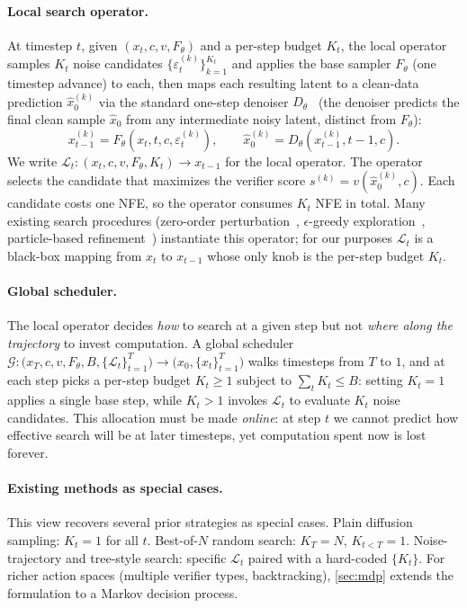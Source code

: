 \paragraph{Local search operator.}
At timestep $t$, given $(x_t, c, v, F_\theta)$ and a per-step budget $K_t$, the local operator samples $K_t$ noise candidates $\{\varepsilon_t^{(k)}\}_{k=1}^{K_t}$ and applies the base sampler $F_\theta$ (one timestep advance) to each, then maps each resulting latent to a clean-data prediction $\hat x_0^{(k)}$ via the standard one-step denoiser $D_\theta$~\citep{song2021scorebased} (the denoiser predicts the final clean sample $\hat x_0$ from any intermediate noisy latent, distinct from $F_\theta$):
\begin{equation}
  x_{t-1}^{(k)} = F_\theta(x_t, t, c, \varepsilon_t^{(k)}),
  \qquad
  \hat{x}_0^{(k)} = D_\theta(x_{t-1}^{(k)}, t-1, c).
  \label{eq:x0_prediction}
\end{equation}
We write $\mathcal{L}_t : (x_t, c, v, F_\theta, K_t) \to x_{t-1}$ for the local operator. The operator selects the candidate that maximizes the verifier score $s^{(k)} = v(\hat{x}_0^{(k)}, c)$. Each candidate costs one NFE, so the operator consumes $K_t$ NFE in total. Many existing search procedures (zero-order perturbation~\citep{tang2024dno}, $\epsilon$-greedy exploration~\citep{ramesh2025nts}, particle-based refinement~\citep{kim2025rbf}) instantiate this operator; for our purposes $\mathcal{L}_t$ is a black-box mapping from $x_t$ to $x_{t-1}$ whose only knob is the per-step budget $K_t$.

\paragraph{Global scheduler.}
The local operator decides \emph{how} to search at a given step but not \emph{where along the trajectory} to invest computation. A global scheduler
$\mathcal{G} : \bigl(x_T, c, v, F_\theta, B, \{\mathcal{L}_t\}_{t=1}^T\bigr) \longrightarrow \bigl(x_0, \{x_t\}_{t=1}^T\bigr)$
walks timesteps from $T$ to $1$, and at each step picks a per-step budget $K_t \ge 1$ subject to $\sum_t K_t \le B$: setting $K_t = 1$ applies a single base step, while $K_t > 1$ invokes $\mathcal{L}_t$ to evaluate $K_t$ noise candidates. This allocation must be made \emph{online}: at step $t$ we cannot predict how effective search will be at later timesteps, yet computation spent now is lost forever.

\paragraph{Existing methods as special cases.}
This view recovers several prior strategies as special cases. Plain diffusion sampling: $K_t = 1$ for all $t$. Best-of-$N$ random search: $K_T = N$, $K_{t<T} = 1$. Noise-trajectory and tree-style search: specific $\mathcal{L}_t$ paired with a hard-coded $\{K_t\}$. For richer action spaces (multiple verifier types, backtracking), \cref{sec:mdp} extends the formulation to a Markov decision process.
